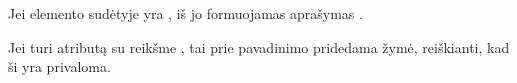 \documentclass[letterpaper,10pt,lithuanian]{sphinxmanual}
\begin{document}
\sphinxAtStartPar
Jei  elemento sudėtyje yra , iš jo formuojamas aprašymas \sphinxhyphen{}
{\hyperref[\detokenize{dimensijos:property.description}]{}}.

\sphinxAtStartPar
Jei  turi atributą {\hyperref[\detokenize{schemos/xsd:xsd-use}]{}} su reikšme , tai prie {\hyperref[\detokenize{formatas:property}]{}}
pavadinimo pridedama  žymė, reiškianti, kad ši {\hyperref[\detokenize{formatas:property}]{}} yra privaloma.
\end{document}
